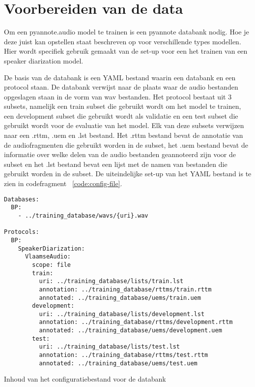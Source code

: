 \section{Voorbereiden van de data}
\label{sec:data}
Om een pyannote.audio model te trainen is een pyannote databank nodig. Hoe je deze juist kan opstellen staat beschreven op \textcite{BredinDatabase} voor verschillende types modellen. Hier wordt specifiek gebruik gemaakt van de set-up voor een het trainen van een speaker diarization model.

De basis van de databank is een YAML bestand waarin een databank en een protocol staan. De databank verwijst naar de plaats waar de audio bestanden opgeslagen staan in de vorm van wav bestanden. Het protocol bestaat uit 3 subsets, namelijk een train subset die gebruikt wordt om het model te trainen, een development subset die gebruikt wordt als validatie en een test subset die gebruikt wordt voor de evaluatie van het model. Elk van deze subsets verwijzen naar een .rttm, .uem en .lst bestand. Het .rttm bestand bevat de annotatie van de audiofragmenten die gebruikt worden in de subset, het .uem bestand bevat de informatie over welke delen van de audio bestanden geannoteerd zijn voor de subset en het .lst bestand bevat een lijst met de namen van bestanden die gebruikt worden in de subset. De uiteindelijke set-up van het YAML bestand is te zien in codefragment ~\ref{code:config-file}.

\begin{listing}
	\begin{verbatim}
Databases:
  BP: 
    - ../training_database/wavs/{uri}.wav

Protocols:
  BP:
    SpeakerDiarization:
      VlaamseAudio:
        scope: file
        train:
          uri: ../training_database/lists/train.lst
          annotation: ../training_database/rttms/train.rttm
          annotated: ../training_database/uems/train.uem
        development:
          uri: ../training_database/lists/development.lst
          annotation: ../training_database/rttms/development.rttm
          annotated: ../training_database/uems/development.uem
        test:
          uri: ../training_database/lists/test.lst
          annotation: ../training_database/rttms/test.rttm
          annotated: ../training_database/uems/test.uem
	\end{verbatim}
	\caption[Configuratie databank]{\label{code:config-file}Inhoud van het configuratiebestand voor de databank}
\end{listing}

